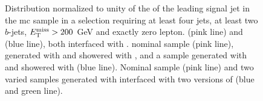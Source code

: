 \begin{figure}[htb]
\centering 
{}
\caption{Distribution normalized to unity of the \pt of the leading signal jet in the \ttbar \gls{mc} sample in a selection requiring at least four jets, at least two $b$-jets, $E_{\rm T}^{\mathrm{miss}}>200$ GeV and exactly zero lepton. 
 \PowhegBox (pink line) and \aNLO (blue line), both interfaced with \HWpp.
 nominal sample (pink line), generated with \PowhegBox and showered with \PY, and a sample generated with \PowhegBox and showered with \HWpp (blue line).
 Nominal sample (pink line) and two varied samples generated with \PowhegBox interfaced with two versions of \PY (blue and green line).}\label{fig:ttbar_ptj1_0L_syst}
\end{figure}


